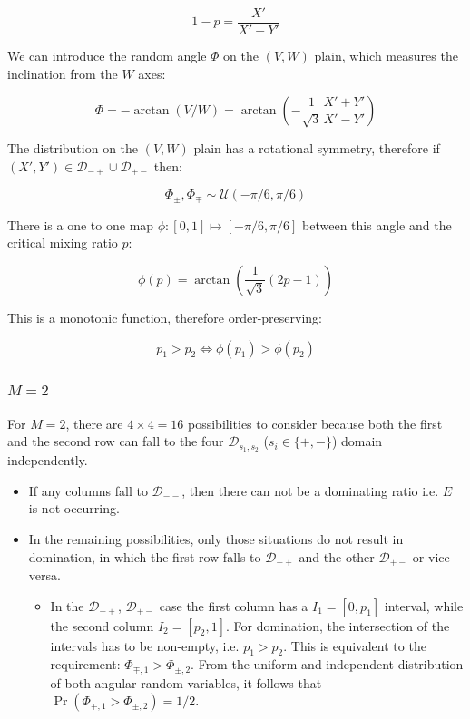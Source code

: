 \documentclass{article}
\theoremstyle{definition}
\begin{document}
\begin{appendices}
\begin{equation}
    1-p =  \frac{X'}{X'-Y'}
\end{equation}

We can introduce the random angle $\Phi$ on the $(V,W)$ plain, which measures the inclination from the $W$ axes: 

\begin{equation}
    \Phi = - \arctan(V/W) =
    \arctan\left( -\frac{1}{\sqrt{3}} \frac{X'+Y'}{X'-Y'} \right)
\end{equation}

The distribution on the $(V,W)$ plain has a rotational symmetry, therefore
if $(X',Y') \in \mathcal{D}_{-+} \cup \mathcal{D}_{+-}$ then:

\begin{equation}
    \Phi_{\pm},\Phi_{\mp} \sim \mathcal{U}(-\pi/6,\pi/6)
\end{equation}

There is a one to one map $\phi : [0,1] \mapsto [-\pi/6,\pi/6]$ between this angle and the critical mixing ratio $p$:

\begin{equation}
    \phi(p) = \arctan \left( \frac{1}{\sqrt{3}} (2 p-1) \right)
\end{equation}

This is a monotonic function, therefore order-preserving:

\begin{equation}
    p_1 > p_2  \iff \phi(p_1) > \phi(p_2)
\end{equation}


\subsubsection{$M=2$}

For $M=2$, there are $4 \times 4 = 16$ possibilities to consider because both the first and the second row can fall to the four $\mathcal{D}_{s_1,s_2}$ ($s_i \in \{+,-\}$) domain independently.

\begin{itemize}
    \item If any columns fall to $\mathcal{D}_{--}$, then there can not be a dominating ratio i.e. $E$ is not occurring.
    \item In the remaining possibilities, only those situations do not result in domination, in which the first row falls to $\mathcal{D}_{-+}$ and the other $\mathcal{D}_{+-}$ or vice versa.
    \begin{itemize}
        \item In the $\mathcal{D}_{-+}$, $\mathcal{D}_{+-}$ case the first column has a $I_1 = [0,p_1]$ interval, while the second column $I_2=[p_2,1]$.
        For domination, the intersection of the intervals has to be non-empty, i.e. $p_1>p_2$.
        This is equivalent to the requirement: $\Phi_{\mp,1} > \Phi_{\pm,2}$.
        From the uniform and independent distribution of both angular random variables, it follows that $\Pr(\Phi_{\mp,1} > \Phi_{\pm,2}) = 1/2$.
    \end{itemize}
\end{itemize}


\end{appendices}
\end{document}
